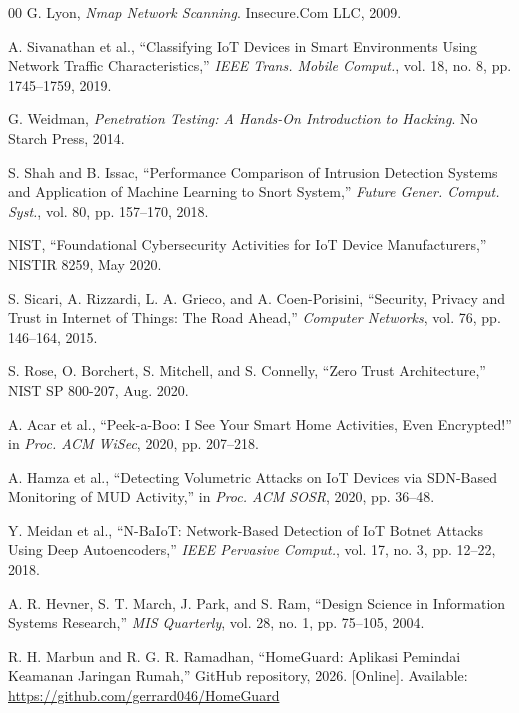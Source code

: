\documentclass[conference]{IEEEtran}
\begin{document}
\begin{thebibliography}{00}
G. Lyon, \textit{Nmap Network Scanning}. Insecure.Com LLC, 2009.

A. Sivanathan et al., ``Classifying IoT Devices in Smart Environments
Using Network Traffic Characteristics,'' \textit{IEEE Trans. Mobile
Comput.}, vol. 18, no. 8, pp. 1745--1759, 2019.

G. Weidman, \textit{Penetration Testing: A Hands-On Introduction to
Hacking}. No Starch Press, 2014.

S. Shah and B. Issac, ``Performance Comparison of Intrusion Detection
Systems and Application of Machine Learning to Snort System,''
\textit{Future Gener. Comput. Syst.}, vol. 80, pp. 157--170, 2018.

NIST, ``Foundational Cybersecurity Activities for IoT Device
Manufacturers,'' NISTIR 8259, May 2020.

S. Sicari, A. Rizzardi, L. A. Grieco, and A. Coen-Porisini, ``Security,
Privacy and Trust in Internet of Things: The Road Ahead,''
\textit{Computer Networks}, vol. 76, pp. 146--164, 2015.

S. Rose, O. Borchert, S. Mitchell, and S. Connelly, ``Zero Trust
Architecture,'' NIST SP 800-207, Aug. 2020.

A. Acar et al., ``Peek-a-Boo: I See Your Smart Home Activities, Even
Encrypted!'' in \textit{Proc. ACM WiSec}, 2020, pp. 207--218.

A. Hamza et al., ``Detecting Volumetric Attacks on IoT Devices via
SDN-Based Monitoring of MUD Activity,'' in \textit{Proc. ACM SOSR},
2020, pp. 36--48.

Y. Meidan et al., ``N-BaIoT: Network-Based Detection of IoT Botnet Attacks
Using Deep Autoencoders,'' \textit{IEEE Pervasive Comput.}, vol. 17,
no. 3, pp. 12--22, 2018.

A. R. Hevner, S. T. March, J. Park, and S. Ram, ``Design Science in
Information Systems Research,'' \textit{MIS Quarterly}, vol. 28, no. 1,
pp. 75--105, 2004.

R. H. Marbun and R. G. R. Ramadhan, ``HomeGuard: Aplikasi Pemindai
Keamanan Jaringan Rumah,'' GitHub repository, 2026. [Online]. Available:
\url{https://github.com/gerrard046/HomeGuard}

\end{thebibliography}
\end{document}

